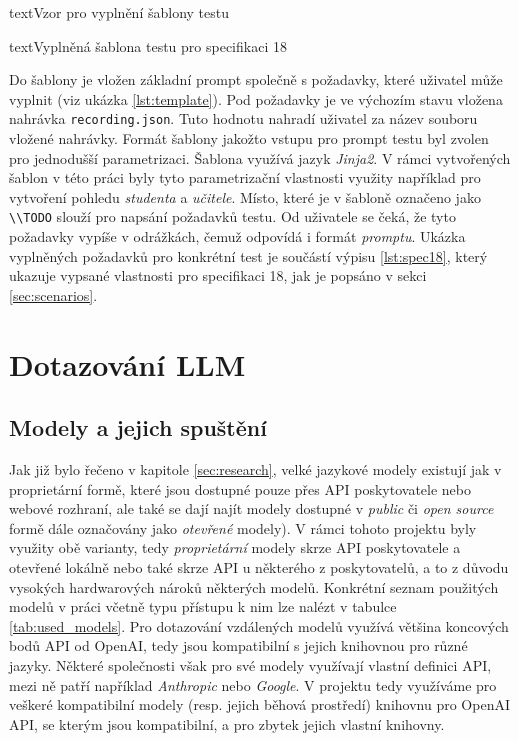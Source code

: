 \documentclass[czech, ma, kiv, he, iso690numb, pdf, viewonly]{fasthesis}
\begin{document}
\begin{code}{text}{Vzor pro vyplnění šablony testu \label{lst:template}}
{\begin{code}{text}{Vyplněná šablona testu pro specifikaci 18 \label{lst:spec18}}
{            Do šablony je vložen základní prompt společně s požadavky, které uživatel může vyplnit (viz ukázka \ref{lst:template}). Pod požadavky je ve výchozím stavu vložena nahrávka \verb|recording.json|. Tuto hodnotu nahradí uživatel za název souboru vložené nahrávky. Formát šablony jakožto vstupu pro prompt testu byl zvolen pro jednodušší parametrizaci. Šablona využívá jazyk \emph{Jinja2}. V rámci vytvořených šablon v této práci byly tyto parametrizační vlastnosti využity například pro vytvoření pohledu \textit{studenta} a \textit{učitele}. Místo, které je v šabloně označeno jako \verb|\\TODO| slouží pro napsání požadavků testu. Od uživatele se čeká, že tyto požadavky vypíše v odrážkách, čemuž odpovídá i formát \emph{promptu}. Ukázka vyplněných požadavků pro konkrétní test je součástí výpisu \ref{lst:spec18}, který ukazuje vypsané vlastnosti pro specifikaci 18, jak je popsáno v sekci \ref{sec:scenarios}.


    \section{Dotazování LLM}

        \subsection{Modely a jejich spuštění}

            Jak již bylo řečeno v kapitole \ref{sec:research}, velké jazykové modely existují jak v proprietární formě, které jsou dostupné pouze přes API poskytovatele nebo webové rozhraní, ale také se dají najít modely dostupné v \textit{public} či \textit{open source} formě dále označovány jako \emph{otevřené} modely). V rámci tohoto projektu byly využity obě varianty, tedy \emph{proprietární} modely skrze API poskytovatele a otevřené lokálně nebo také skrze API u některého z poskytovatelů, a to z důvodu vysokých hardwarových nároků některých modelů. Konkrétní seznam použitých modelů v práci včetně typu přístupu k nim lze nalézt v tabulce \ref{tab:used_models}. Pro dotazování vzdálených modelů využívá většina koncových bodů API od OpenAI, tedy jsou kompatibilní s jejich knihovnou pro různé jazyky. Některé společnosti však pro své modely využívají vlastní definici API, mezi ně patří například \textit{Anthropic} nebo \textit{Google}. V projektu tedy využíváme pro veškeré kompatibilní modely (resp. jejich běhová prostředí) knihovnu pro OpenAI API, se kterým jsou kompatibilní, a pro zbytek jejich vlastní knihovny.

}
\end{code}}
\end{code}
\end{document}
